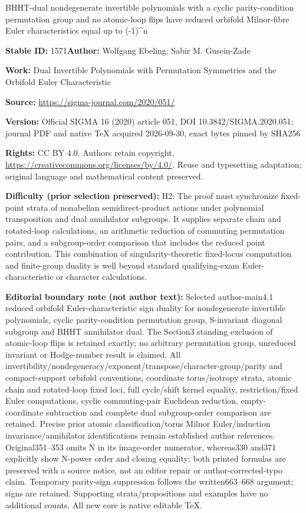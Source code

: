 \documentclass[11pt]{article}
\numberwithin{equation}{section}
\numberwithin{equation}{section}
\begin{document}
\begin{center}\Large BHHT-dual nondegenerate invertible polynomials with a cyclic parity-condition permutation group and no atomic-loop flips have reduced orbifold Milnor-fibre Euler characteristics equal up to (-1)\textasciicircum{}n\end{center}
\noindent\textbf{Stable ID:} 1571\quad\textbf{Author:} Wolfgang Ebeling; Sabir M. Gusein-Zade\par
\noindent\textbf{Work:} Dual Invertible Polynomials with Permutation Symmetries and the Orbifold Euler Characteristic\par
\noindent\textbf{Source:} \url{https://sigma-journal.com/2020/051/}\par
\noindent\textbf{Version:} Official SIGMA 16 (2020) article 051, DOI 10.3842/SIGMA.2020.051; journal PDF and native TeX acquired 2026-09-30, exact bytes pinned by SHA256\par
\noindent\textbf{Rights:} CC BY 4.0. Authors retain copyright. \url{https://creativecommons.org/licenses/by/4.0/}. Reuse and typesetting adaptation; original language and mathematical content preserved.\par
\noindent\textbf{Difficulty (prior selection preserved):} {\CJKfont H2: The proof must synchronize fixed-point strata of nonabelian semidirect-product actions under polynomial transposition and dual annihilator subgroups. It supplies separate chain and rotated-loop calculations, an arithmetic reduction of commuting permutation pairs, and a subgroup-order comparison that includes the reduced point contribution. This combination of singularity-theoretic fixed-locus computation and finite-group duality is well beyond standard qualifying-exam Euler-characteristic or character calculations.}\par
\medskip\noindent\textbf{Editorial boundary note (not author text):} Selected author-main4.1 reduced orbifold Euler-characteristic sign duality for nondegenerate invertible polynomials, cyclic parity-condition permutation group, S-invariant diagonal subgroup and BHHT annihilator dual. The Section3 standing exclusion of atomic-loop flips is retained exactly; no arbitrary permutation group, unreduced invariant or Hodge-number result is claimed. All invertibility/nondegeneracy/exponent/transpose/character-group/parity and compact-support orbifold conventions, coordinate torus/isotropy strata, atomic chain and rotated-loop fixed loci, full cycle/shift kernel equality, restriction/fixed Euler computations, cyclic commuting-pair Euclidean reduction, empty-coordinate subtraction and complete dual subgroup-order comparison are retained. Precise prior atomic classification/torus Milnor Euler/induction invariance/annihilator identifications remain established author references. Original351–353 omits N in its image-order numerator, whereas330 and371 explicitly show N-power order and closing equality; both printed formulas are preserved with a source notice, not an editor repair or author-corrected-typo claim. Temporary parity-sign suppression follows the written663–668 argument; signs are retained. Supporting strata/propositions and examples have no additional counts. All new core is native editable TeX.\par
\end{document}
